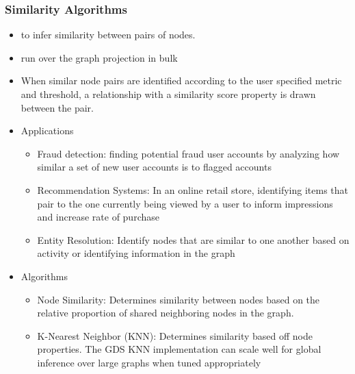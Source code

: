 \begin{frame}[fragile]\frametitle{Similarity Algorithms}

 
\begin{itemize}
\item to infer similarity between pairs of nodes. 
\item run over the graph projection in bulk
\item When similar node pairs are identified according to the user specified metric and threshold, a relationship with a similarity score property is drawn between the pair.
\item Applications
	\begin{itemize}
	\item Fraud detection: finding potential fraud user accounts by analyzing how similar a set of new user accounts is to flagged accounts
	\item Recommendation Systems: In an online retail store, identifying items that pair to the one currently being viewed by a user to inform impressions and increase rate of purchase
	\item Entity Resolution: Identify nodes that are similar to one another based on activity or identifying information in the graph
	\end{itemize}
\item Algorithms 
	\begin{itemize}
	\item Node Similarity: Determines similarity between nodes based on the relative proportion of shared neighboring nodes in the graph. 
	\item K-Nearest Neighbor (KNN): Determines similarity based off node properties. The GDS KNN implementation can scale well for global inference over large graphs when tuned appropriately
	\end{itemize}	
\end{itemize}

\end{frame}


